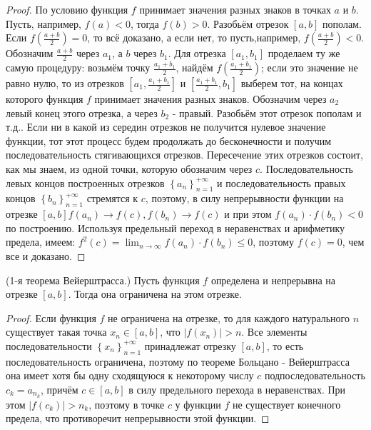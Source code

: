 \begin{proof}
    По условию функция $f$ принимает значения разных знаков в точках $a$ и $b$. Пусть, например, $f(a)<0$, тогда $f(b)>0$. Разобьём отрезок $[a, b]$ пополам. Если $f\left(\frac{a+b}{2}\right)=0$, то всё доказано, а если нет, то пусть,например, $f\left(\frac{a+b}{2}\right)<0$. Обозначим $\frac{a+b}{2}$ через $a_1$, а $b$ через $b_1$. Для отрезка $\left[a_1, b_1\right]$ проделаем ту же самую процедуру: возьмём точку $\frac{a_1+b_1}{2}$, найдём $f\left(\frac{a_1+b_1}{2}\right)$; если это значение не равно нулю, то из отрезков $\left[a_1, \frac{a_1+b_1}{2}\right]$ и $\left[\frac{a_1+b_1}{2}, b_1\right]$ выберем тот, на концах которого функция $f$ принимает значения разных знаков. Обозначим через $a_2$ левый конец этого отрезка, а через $b_2$ - правый. Разобьём этот отрезок пополам и т.д.. Если ни в какой из середин отрезков не получится нулевое значение функции, тот этот процесс будем продолжать до бесконечности и получим последовательность стягивающихся отрезков. Пересечение этих отрезков состоит, как мы знаем, из одной точки, которую обозначим через $c$. Последовательность левых концов построенных отрезков $\left\{a_n\right\}_{n=1}^{+\infty}$ и последовательность правых концов $\left\{b_n\right\}_{n=1}^{+\infty}$ стремятся к $c$, поэтому, в силу непрерывности функции на отрезке $[a, b] f\left(a_n\right) \rightarrow f(c), f\left(b_n\right) \rightarrow f(c)$ и при этом $f\left(a_n\right) \cdot f\left(b_n\right)<0$ по построению. Используя предельный переход в неравенствах и арифметику предела, имеем: $f^2(c)=\lim _{n \rightarrow \infty} f\left(a_n\right) \cdot f\left(b_n\right) \leq 0$, поэтому $f(c)=0$, чем все и доказано.
\end{proof}

\begin{theorem}
    (1-я теорема Вейерштрасса.) Пусть функция $f$ определена и непрерывна на отрезке $[a, b]$. Тогда она ограничена на этом отрезке.
\end{theorem}

\begin{proof}
    Если функция $f$ не ограничена на отрезке, то для каждого натурального $n$ существует такая точка $x_n \in[a, b]$, что $\left|f\left(x_n\right)\right|>n$. Все элементы последовательности $\left\{x_n\right\}_{n=1}^{+\infty}$ принадлежат отрезку $[a, b]$, то есть последовательность ограничена, поэтому по теореме Больцано - Вейерштрасса она имеет хотя бы одну сходящуюся к некоторому числу $c$ подпоследовательность $c_k=a_{n_k}$, причём $c \in[a, b]$ в силу предельного перехода в неравенствах. При этом $\left|f\left(c_k\right)\right|>n_k$, поэтому в точке $c$ у функции $f$ не существует конечного предела, что противоречит непрерывности этой функции.
\end{proof}

